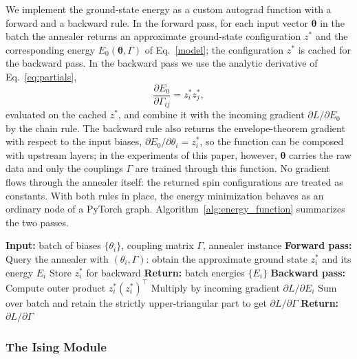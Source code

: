 \documentclass{ieeeaccess}
\begin{document}
We implement the ground-state energy as a custom autograd function with a
forward and a backward rule. In the forward pass, for each input vector
$\boldsymbol{\theta}$ in the batch the annealer returns an approximate
ground-state configuration $z^*$ and the corresponding energy
$E_0(\boldsymbol{\theta}, \Gamma)$ of Eq.~\eqref{model}; the configuration
$z^*$ is cached for the backward pass. In the backward pass we use the
analytic derivative of Eq.~\eqref{eq:partials},
\[
\frac{\partial E_0}{\partial \Gamma_{ij}} = z_i^* z_j^*,
\]
evaluated on the cached $z^*$, and combine it with the incoming gradient
$\partial L / \partial E_0$ by the chain rule.
The backward rule also returns the envelope-theorem gradient with respect to
the input biases, $\partial E_0 / \partial \theta_i = z^*_i$, so the function
can be composed with upstream layers; in the experiments of this paper,
however, $\boldsymbol{\theta}$ carries the raw data and only the couplings
$\Gamma$ are trained through this function. No gradient flows through the
annealer itself: the returned spin configurations are treated as constants.
With both rules in place, the
energy minimization behaves as an ordinary node of a PyTorch graph.
Algorithm~\ref{alg:energy_function} summarizes the two passes.

\begin{algorithm}[H]
\caption{Differentiable Ising Energy Function (Forward and Backward)}
\label{alg:energy_function}
\begin{algorithmic}[1]
\STATE \textbf{Input:} batch of biases $\{\theta_i\}$, coupling matrix $\Gamma$, annealer instance
\STATE \textbf{Forward pass:}
    \STATE Query the annealer with $(\theta_i, \Gamma)$: obtain the approximate ground state $z_i^*$ and its energy $E_i$
    \STATE Store $z_i^*$ for backward
\ENDFOR
\STATE \textbf{Return:} batch energies $\{E_i\}$
\STATE \textbf{Backward pass:}
    \STATE Compute outer product $z_i^* (z_i^*)^\top$
    \STATE Multiply by incoming gradient $\partial L / \partial E_i$
\ENDFOR
\STATE Sum over batch and retain the strictly upper-triangular part to get $\partial L / \partial \Gamma$
\STATE \textbf{Return:} $\partial L / \partial \Gamma$
\end{algorithmic}
\end{algorithm}

\subsubsection{The Ising Module}
\end{document}
